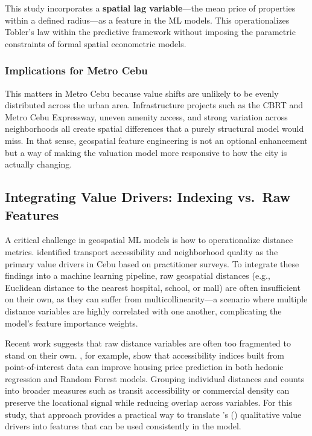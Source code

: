 This study incorporates a \textbf{spatial lag variable}---the mean price of properties within a defined radius---as a feature in the ML models. This operationalizes Tobler's law within the predictive framework without imposing the parametric constraints of formal spatial econometric models.

\subsubsection{Implications for Metro Cebu}\label{implications-for-metro-cebu}

This matters in Metro Cebu because value shifts are unlikely to be evenly distributed across the urban area. Infrastructure projects such as the CBRT and Metro Cebu Expressway, uneven amenity access, and strong variation across neighborhoods all create spatial differences that a purely structural model would miss. In that sense, geospatial feature engineering is not an optional enhancement but a way of making the valuation model more responsive to how the city is actually changing.


\subsection{Integrating Value Drivers: Indexing vs.~Raw Features}\label{integrating-value-drivers-indexing-vs.-raw-features}

A critical challenge in geospatial ML models is how to operationalize distance metrics. \textcite{agosto2020} identified transport accessibility and neighborhood quality as the primary value drivers in Cebu based on practitioner surveys. To integrate these findings into a machine learning pipeline, raw geospatial distances (e.g., Euclidean distance to the nearest hospital, school, or mall) are often insufficient on their own, as they can suffer from multicollinearity---a scenario where multiple distance variables are highly correlated with one another, complicating the model's feature importance weights.

Recent work suggests that raw distance variables are often too fragmented to stand on their own. \textcite{reyblanco2024}, for example, show that accessibility indices built from point-of-interest data can improve housing price prediction in both hedonic regression and Random Forest models. Grouping individual distances and counts into broader measures such as transit accessibility or commercial density can preserve the locational signal while reducing overlap across variables. For this study, that approach provides a practical way to translate \citeauthor{agosto2020}'s (\citeyear{agosto2020}) qualitative value drivers into features that can be used consistently in the model.



